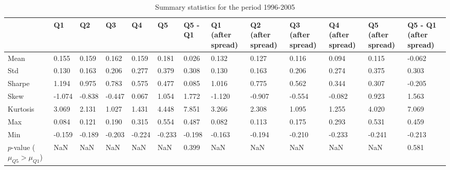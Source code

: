 \begin{table}
\caption{Summary statistics for the period 1996-2005}
\label{tab:summary_1996_2005}
\begin{tabular}{lllllllllllll}
\toprule
 & Q1 & Q2 & Q3 & Q4 & Q5 & Q5 - Q1 & Q1 (after spread) & Q2 (after spread) & Q3 (after spread) & Q4 (after spread) & Q5 (after spread) & Q5 - Q1 (after spread) \\
\midrule
Mean & 0.155 & 0.159 & 0.162 & 0.159 & 0.181 & 0.026 & 0.132 & 0.127 & 0.116 & 0.094 & 0.115 & -0.062 \\
Std & 0.130 & 0.163 & 0.206 & 0.277 & 0.379 & 0.308 & 0.130 & 0.163 & 0.206 & 0.274 & 0.375 & 0.303 \\
Sharpe & 1.194 & 0.975 & 0.783 & 0.575 & 0.477 & 0.085 & 1.016 & 0.775 & 0.562 & 0.344 & 0.307 & -0.205 \\
Skew & -1.074 & -0.838 & -0.447 & 0.067 & 1.054 & 1.772 & -1.120 & -0.907 & -0.554 & -0.082 & 0.923 & 1.563 \\
Kurtosis & 3.069 & 2.131 & 1.027 & 1.431 & 4.448 & 7.851 & 3.266 & 2.308 & 1.095 & 1.255 & 4.020 & 7.069 \\
Max & 0.084 & 0.121 & 0.190 & 0.315 & 0.554 & 0.487 & 0.082 & 0.113 & 0.175 & 0.293 & 0.531 & 0.459 \\
Min & -0.159 & -0.189 & -0.203 & -0.224 & -0.233 & -0.198 & -0.163 & -0.194 & -0.210 & -0.233 & -0.241 & -0.213 \\
$p$-value ($\mu_{Q5} > \mu_{Q1}$) & NaN & NaN & NaN & NaN & NaN & 0.399 & NaN & NaN & NaN & NaN & NaN & 0.581 \\
\bottomrule
\end{tabular}
\end{table}
